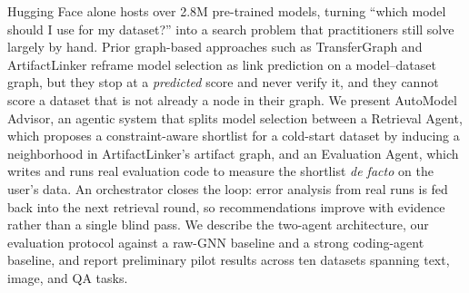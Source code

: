 Hugging Face alone hosts over 2.8M pre-trained models, turning ``which model should I use for my dataset?'' into a search problem that practitioners still solve largely by hand. Prior graph-based approaches such as TransferGraph and ArtifactLinker reframe model selection as link prediction on a model--dataset graph, but they stop at a \emph{predicted} score and never verify it, and they cannot score a dataset that is not already a node in their graph. We present AutoModel Advisor, an agentic system that splits model selection between a Retrieval Agent, which proposes a constraint-aware shortlist for a cold-start dataset by inducing a neighborhood in ArtifactLinker's artifact graph, and an Evaluation Agent, which writes and runs real evaluation code to measure the shortlist \emph{de facto} on the user's data. An orchestrator closes the loop: error analysis from real runs is fed back into the next retrieval round, so recommendations improve with evidence rather than a single blind pass. We describe the two-agent architecture, our evaluation protocol against a raw-GNN baseline and a strong coding-agent baseline, and report preliminary pilot results across ten datasets spanning text, image, and QA tasks.
